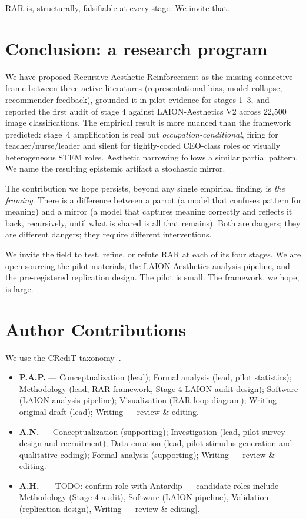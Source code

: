 \documentclass[sigconf,nonacm]{acmart}
\begin{document}
RAR is, structurally, falsifiable at every stage. We invite that.

\section{Conclusion: a research program}

We have proposed Recursive Aesthetic Reinforcement as the missing connective frame between three active literatures (representational bias, model collapse, recommender feedback), grounded it in pilot evidence for stages 1--3, and reported the first audit of stage 4 against LAION-Aesthetics V2 across 22{,}500 image classifications. The empirical result is more nuanced than the framework predicted: stage~4 amplification is real but \emph{occupation-conditional}, firing for teacher/nurse/leader and silent for tightly-coded CEO-class roles or visually heterogeneous STEM roles. Aesthetic narrowing follows a similar partial pattern. We name the resulting epistemic artifact a stochastic mirror.

The contribution we hope persists, beyond any single empirical finding, is \emph{the framing}. There is a difference between a parrot (a model that confuses pattern for meaning) and a mirror (a model that captures meaning correctly and reflects it back, recursively, until what is shared is all that remains). Both are dangers; they are different dangers; they require different interventions.

We invite the field to test, refine, or refute RAR at each of its four stages. We are open-sourcing the pilot materials, the LAION-Aesthetics analysis pipeline, and the pre-registered replication design. The pilot is small. The framework, we hope, is large.

\section*{Author Contributions}

We use the CRediT taxonomy~\cite{credit2014}.

\begin{itemize}\itemsep0pt
  \item \textbf{P.A.P.} --- Conceptualization (lead); Formal analysis (lead, pilot statistics); Methodology (lead, RAR framework, Stage-4 LAION audit design); Software (LAION analysis pipeline); Visualization (RAR loop diagram); Writing --- original draft (lead); Writing --- review \& editing.
  \item \textbf{A.N.} --- Conceptualization (supporting); Investigation (lead, pilot survey design and recruitment); Data curation (lead, pilot stimulus generation and qualitative coding); Formal analysis (supporting); Writing --- review \& editing.
  \item \textbf{A.H.} --- [TODO: confirm role with Antardip --- candidate roles include Methodology (Stage-4 audit), Software (LAION pipeline), Validation (replication design), Writing --- review \& editing].
\end{itemize}
\end{document}
